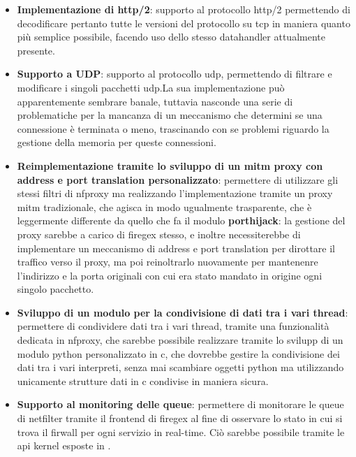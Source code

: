 \begin{itemize}
    \setlength{\itemsep}{2pt}
    \setlength{\parskip}{2pt}
    \item \textbf{Implementazione di \gls{http}/2}: supporto al protocollo \gls{http}/2 permettendo di decodificare pertanto tutte le versioni del protocollo su \gls{tcp} in maniera quanto più semplice possibile, facendo uso dello stesso datahandler attualmente presente.
    \item \textbf{Supporto a UDP}: supporto al protocollo \gls{udp}, permettendo di filtrare e modificare i singoli pacchetti \gls{udp}.\@ La sua implementazione può apparentemente sembrare banale, tuttavia nasconde una serie di problematiche per la mancanza di un meccanismo che determini se una connessione è terminata o meno, trascinando con se problemi riguardo la gestione della memoria per queste connessioni.
    \item \textbf{Reimplementazione tramite lo sviluppo di un \gls{mitm} proxy con address e port translation personalizzato}: permettere di utilizzare gli stessi filtri di \gls{nfproxy} ma realizzando l'implementazione tramite un proxy \gls{mitm} tradizionale, che agisca in modo ugualmente trasparente, che è leggermente differente da quello che fa il modulo \textbf{\gls{porthijack}}: la gestione del proxy sarebbe a carico di firegex stesso, e inoltre necessiterebbe di implementare un meccanismo di address e port translation per dirottare il traffico verso il proxy, ma poi reinoltrarlo nuovamente per mantenenre l'indirizzo e la porta originali con cui era stato mandato in origine ogni singolo pacchetto.
    \item \textbf{Sviluppo di un modulo per la condivisione di dati tra i vari thread}: permettere di condividere dati tra i vari thread, tramite una funzionalità dedicata in \gls{nfproxy}, che sarebbe possibile realizzare tramite lo svilupp di un modulo python personalizzato in c, che dovrebbe gestire la condivisione dei dati tra i vari interpreti, senza mai scambiare oggetti python ma utilizzando unicamente strutture dati in c condivise in maniera sicura.
    \item \textbf{Supporto al monitoring delle queue}: permettere di monitorare le queue di netfilter tramite il frontend di firegex al fine di osservare lo stato in cui si trova il firwall per ogni servizio in real-time. Ciò sarebbe possibile tramite le \gls{api} kernel esposte in .
\end{itemize}
